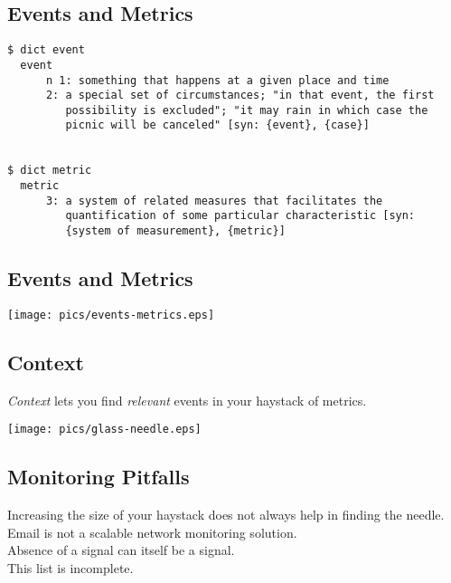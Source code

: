 \documentclass[xga]{xdvislides}
\begin{document}
\subsection{Events and Metrics}
\vspace*{\fill}
\begin{verbatim}
$ dict event
  event
      n 1: something that happens at a given place and time
      2: a special set of circumstances; "in that event, the first
         possibility is excluded"; "it may rain in which case the
         picnic will be canceled" [syn: {event}, {case}]


$ dict metric
  metric
      3: a system of related measures that facilitates the
         quantification of some particular characteristic [syn:
         {system of measurement}, {metric}]

\end{verbatim}
\vspace*{\fill}

\subsection{Events and Metrics}
\begin{center}
	\texttt{[image: pics/events-metrics.eps]}
\end{center}

\subsection{Context}
{\em Context} lets you find {\em relevant} events in
your haystack of metrics.

\begin{center}
	\texttt{[image: pics/glass-needle.eps]}
\end{center}

\subsection{Monitoring Pitfalls}
\vspace*{\fill}
\Huge
\begin{center}
Increasing the size of your haystack does not always
help in finding the needle. \\
\vspace{.4in}
Email is not a scalable network monitoring solution. \\
\vspace{.4in}
Absence of a signal can itself be a signal. \\
\vspace{.4in}
This list is incomplete.
\end{center}
\Normalsize
\vspace*{\fill}
\end{document}
